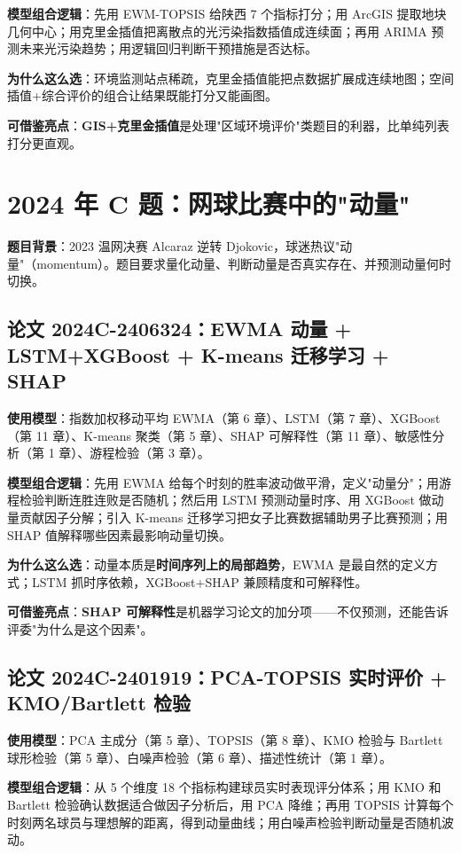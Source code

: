 \textbf{模型组合逻辑}：先用 EWM-TOPSIS 给陕西 7 个指标打分；用 ArcGIS 提取地块几何中心；用克里金插值把离散点的光污染指数插值成连续面；再用 ARIMA 预测未来光污染趋势；用逻辑回归判断干预措施是否达标。

\textbf{为什么这么选}：环境监测站点稀疏，克里金插值能把点数据扩展成连续地图；空间插值+综合评价的组合让结果既能打分又能画图。

\textbf{可借鉴亮点}：\textbf{GIS+克里金插值}是处理"区域环境评价"类题目的利器，比单纯列表打分更直观。

\section{2024 年 C 题：网球比赛中的"动量"}

\textbf{题目背景}：2023 温网决赛 Alcaraz 逆转 Djokovic，球迷热议"动量"（momentum）。题目要求量化动量、判断动量是否真实存在、并预测动量何时切换。

\subsection{论文 2024C-2406324：EWMA 动量 + LSTM+XGBoost + K-means 迁移学习 + SHAP}
\textbf{使用模型}：指数加权移动平均 EWMA（第 6 章）、LSTM（第 7 章）、XGBoost（第 11 章）、K-means 聚类（第 5 章）、SHAP 可解释性（第 11 章）、敏感性分析（第 1 章）、游程检验（第 3 章）。

\textbf{模型组合逻辑}：先用 EWMA 给每个时刻的胜率波动做平滑，定义"动量分"；用游程检验判断连胜连败是否随机；然后用 LSTM 预测动量时序、用 XGBoost 做动量贡献因子分解；引入 K-means 迁移学习把女子比赛数据辅助男子比赛预测；用 SHAP 值解释哪些因素最影响动量切换。

\textbf{为什么这么选}：动量本质是\textbf{时间序列上的局部趋势}，EWMA 是最自然的定义方式；LSTM 抓时序依赖，XGBoost+SHAP 兼顾精度和可解释性。

\textbf{可借鉴亮点}：\textbf{SHAP 可解释性}是机器学习论文的加分项——不仅预测，还能告诉评委"为什么是这个因素"。

\subsection{论文 2024C-2401919：PCA-TOPSIS 实时评价 + KMO/Bartlett 检验}
\textbf{使用模型}：PCA 主成分（第 5 章）、TOPSIS（第 8 章）、KMO 检验与 Bartlett 球形检验（第 5 章）、白噪声检验（第 6 章）、描述性统计（第 1 章）。

\textbf{模型组合逻辑}：从 5 个维度 18 个指标构建球员实时表现评分体系；用 KMO 和 Bartlett 检验确认数据适合做因子分析后，用 PCA 降维；再用 TOPSIS 计算每个时刻两名球员与理想解的距离，得到动量曲线；用白噪声检验判断动量是否随机波动。

